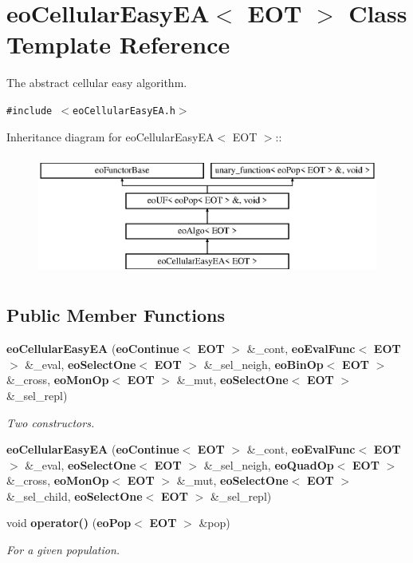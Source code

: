 \section{eo\-Cellular\-Easy\-EA$<$ EOT $>$ Class Template Reference}
\label{classeo_cellular_easy_e_a}
The abstract cellular easy algorithm.  


{\tt \#include $<$eo\-Cellular\-Easy\-EA.h$>$}

Inheritance diagram for eo\-Cellular\-Easy\-EA$<$ EOT $>$::\begin{figure}[H]
\begin{center}
\leavevmode
\includegraphics[height=4cm]{classeo_cellular_easy_e_a}
\end{center}
\end{figure}
\subsection*{Public Member Functions}
\begin{CompactItemize}
\item 
{\bf eo\-Cellular\-Easy\-EA} ({\bf eo\-Continue}$<$ {\bf EOT} $>$ \&\_\-cont, {\bf eo\-Eval\-Func}$<$ {\bf EOT} $>$ \&\_\-eval, {\bf eo\-Select\-One}$<$ {\bf EOT} $>$ \&\_\-sel\_\-neigh, {\bf eo\-Bin\-Op}$<$ {\bf EOT} $>$ \&\_\-cross, {\bf eo\-Mon\-Op}$<$ {\bf EOT} $>$ \&\_\-mut, {\bf eo\-Select\-One}$<$ {\bf EOT} $>$ \&\_\-sel\_\-repl)\label{classeo_cellular_easy_e_a_a0}

\begin{CompactList}\small\item\em Two constructors. \item\end{CompactList}\item 
{\bf eo\-Cellular\-Easy\-EA} ({\bf eo\-Continue}$<$ {\bf EOT} $>$ \&\_\-cont, {\bf eo\-Eval\-Func}$<$ {\bf EOT} $>$ \&\_\-eval, {\bf eo\-Select\-One}$<$ {\bf EOT} $>$ \&\_\-sel\_\-neigh, {\bf eo\-Quad\-Op}$<$ {\bf EOT} $>$ \&\_\-cross, {\bf eo\-Mon\-Op}$<$ {\bf EOT} $>$ \&\_\-mut, {\bf eo\-Select\-One}$<$ {\bf EOT} $>$ \&\_\-sel\_\-child, {\bf eo\-Select\-One}$<$ {\bf EOT} $>$ \&\_\-sel\_\-repl)\label{classeo_cellular_easy_e_a_a1}

\item 
void {\bf operator()} ({\bf eo\-Pop}$<$ {\bf EOT} $>$ \&pop)\label{classeo_cellular_easy_e_a_a2}

\begin{CompactList}\small\item\em For a given population. \item\end{CompactList}\end{CompactItemize}
